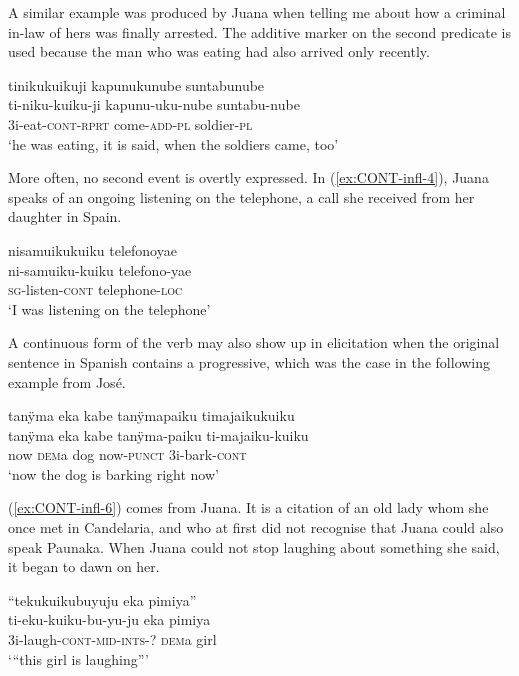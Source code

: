 A similar example was produced by Juana when telling me about how a criminal in-law of hers was finally arrested. The additive marker on the second predicate is used because the man who was eating had also arrived only recently.

\ea\label{ex:CONT-infl-3}
\begingl
\glpreamble tinikukuikuji kapunukunube suntabunube\\
\gla ti-niku-kuiku-ji kapunu-uku-nube suntabu-nube\\
\glb 3i-eat-\textsc{cont}-\textsc{rprt} come-\textsc{add}-\textsc{pl} soldier-\textsc{pl}\\
\glft ‘he was eating, it is said, when the soldiers came, too’
\endgl
\trailingcitation{[jxx-p120430l-2.151]}
\xe

More often, no second event is overtly expressed. In (\ref{ex:CONT-infl-4}), Juana speaks of an ongoing listening on the telephone, a call she received from her daughter in Spain.

\ea\label{ex:CONT-infl-4}
\begingl
\glpreamble nisamuikukuiku telefonoyae\\
\gla ni-samuiku-kuiku telefono-yae\\
\textsc{sg}-listen-\textsc{cont} telephone-\textsc{loc}\\
\glft ‘I was listening on the telephone’
\endgl
\trailingcitation{[jxx-p110923l-1.305]}
\xe

A continuous form of the verb may also show up in elicitation when the original sentence in Spanish contains a progressive, which was the case in the following example from José.

\ea\label{ex:CONT-infl-5}
\begingl
\glpreamble tanÿma eka kabe tanÿmapaiku timajaikukuiku\\
\gla tanÿma eka kabe tanÿma-paiku ti-majaiku-kuiku\\
\glb now \textsc{dem}a dog now-\textsc{punct} 3i-bark-\textsc{cont}\\
\glft ‘now the dog is barking right now’
\endgl
\trailingcitation{[mox-a110920l-1]}
\xe

(\ref{ex:CONT-infl-6}) comes from Juana. It is a citation of an old lady whom she once met in Candelaria, and who at first did not recognise that Juana could also speak Paunaka. When Juana could not stop laughing about something she said, it began to dawn on her.

\ea\label{ex:CONT-infl-6}
\begingl
\glpreamble “tekukuikubuyuju eka pimiya”\\
\gla ti-eku-kuiku-bu-yu-ju eka pimiya\\
\glb 3i-laugh-\textsc{cont}-\textsc{mid}-\textsc{ints}-? \textsc{dem}a girl\\
\glft ‘“this girl is laughing”’
\endgl
\trailingcitation{[jxx-p120515l-1.085]}
\xe


